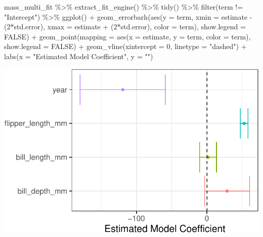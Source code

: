 \documentclass[
  letterpaper,
  DIV=11,
  numbers=noendperiod]{scrartcl}
\newenvironment{Shaded}{\begin{snugshade}}{\end{snugshade}}
\newcommand{\AttributeTok}[1]{\textcolor[rgb]{0.40,0.45,0.13}{#1}}
\newcommand{\ConstantTok}[1]{\textcolor[rgb]{0.56,0.35,0.01}{#1}}
\newcommand{\DecValTok}[1]{\textcolor[rgb]{0.68,0.00,0.00}{#1}}
\newcommand{\FunctionTok}[1]{\textcolor[rgb]{0.28,0.35,0.67}{#1}}
\newcommand{\NormalTok}[1]{\textcolor[rgb]{0.00,0.23,0.31}{#1}}
\newcommand{\SpecialCharTok}[1]{\textcolor[rgb]{0.37,0.37,0.37}{#1}}
\newcommand{\StringTok}[1]{\textcolor[rgb]{0.13,0.47,0.30}{#1}}
\begin{document}
\begin{Shaded}
\begin{Highlighting}[]
\NormalTok{mass\_multi\_fit }\SpecialCharTok{\%\textgreater{}\%}
  \FunctionTok{extract\_fit\_engine}\NormalTok{() }\SpecialCharTok{\%\textgreater{}\%}
  \FunctionTok{tidy}\NormalTok{() }\SpecialCharTok{\%\textgreater{}\%}
  \FunctionTok{filter}\NormalTok{(term }\SpecialCharTok{!=} \StringTok{"Intercept"}\NormalTok{) }\SpecialCharTok{\%\textgreater{}\%}
  \FunctionTok{ggplot}\NormalTok{() }\SpecialCharTok{+}
  \FunctionTok{geom\_errorbarh}\NormalTok{(}\FunctionTok{aes}\NormalTok{(}\AttributeTok{y =}\NormalTok{ term, }
                     \AttributeTok{xmin =}\NormalTok{ estimate }\SpecialCharTok{{-}}\NormalTok{ (}\DecValTok{2}\SpecialCharTok{*}\NormalTok{std.error), }
                     \AttributeTok{xmax =}\NormalTok{ estimate }\SpecialCharTok{+}\NormalTok{ (}\DecValTok{2}\SpecialCharTok{*}\NormalTok{std.error),}
                     \AttributeTok{color =}\NormalTok{ term),}
                 \AttributeTok{show.legend =} \ConstantTok{FALSE}\NormalTok{) }\SpecialCharTok{+}
  \FunctionTok{geom\_point}\NormalTok{(}\AttributeTok{mapping =} \FunctionTok{aes}\NormalTok{(}\AttributeTok{x =}\NormalTok{ estimate, }\AttributeTok{y =}\NormalTok{ term, }\AttributeTok{color =}\NormalTok{ term),}
             \AttributeTok{show.legend =} \ConstantTok{FALSE}\NormalTok{) }\SpecialCharTok{+}
  \FunctionTok{geom\_vline}\NormalTok{(}\AttributeTok{xintercept =} \DecValTok{0}\NormalTok{, }\AttributeTok{linetype =} \StringTok{"dashed"}\NormalTok{) }\SpecialCharTok{+}
  \FunctionTok{labs}\NormalTok{(}\AttributeTok{x =} \StringTok{"Estimated Model Coefficient"}\NormalTok{,}
       \AttributeTok{y =} \StringTok{""}\NormalTok{)}
\end{Highlighting}
\end{Shaded}

\includegraphics{10d_MultipleLinearRegression_files/figure-pdf/unnamed-chunk-7-1.pdf}
\end{document}
